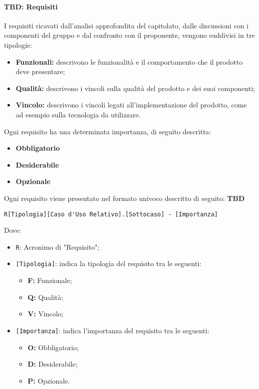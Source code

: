 \documentclass[a4paper, 12pt]{article}
\begin{document}
\paragraph{TBD: Requisiti}
I requisiti ricavati dall'analisi approfondita del capitolato, dalle discussioni
con i componenti del gruppo e dal confronto con il proponente, vengono suddivisi
in tre tipologie:
\begin{itemize}
    \item \textbf{Funzionali:} descrivono le funzionalità e il comportamento
    che il prodotto deve presentare;
    \item \textbf{Qualità:} descrivono i vincoli sulla qualità del prodotto e
    dei suoi componenti;
    \item \textbf{Vincolo:} descrivono i vincoli legati all'implementazione del
    prodotto, come ad esempio sulla tecnologia da utilizzare.
\end{itemize}
Ogni requisito ha una determinata importanza, di seguito descritta:
\begin{itemize}
    \item \textbf{Obbligatorio}
    \item \textbf{Desiderabile}
    \item \textbf{Opzionale}
\end{itemize}
Ogni requisito viene presentato nel formato univoco descritto di seguito: \textbf{TBD}
\begin{center}
    \begin{BVerbatim}
R[Tipologia][Caso d'Uso Relativo].[Sottocaso] - [Importanza]
    \end{BVerbatim}   
\end{center}
Dove:
\begin{itemize}
    \item \Verb^R^: Acronimo di "Requisito";
    \item \Verb^[Tipologia]^: indica la tipologia del requisito tra le seguenti:
    \begin{itemize}
        \item \textbf{F:} Funzionale;
        \item \textbf{Q:} Qualità;
        \item \textbf{V:} Vincolo;
    \end{itemize}
    \item \Verb^[Importanza]^: indica l'importanza del requisito tra le seguenti:
    \begin{itemize}
        \item \textbf{O:} Obbligatorio;
        \item \textbf{D:} Desiderabile;
        \item \textbf{P:} Opzionale.
    \end{itemize}
\end{itemize}
\end{document}

